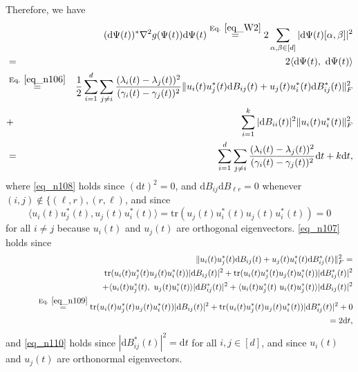 \documentclass[11pt,letterpaper]{article}
\begin{document}
\begin{enumerate}
\noindent  
  Therefore, we have
  \begin{eqnarray}
& & \!\!\!\!\!\!\!\!\!\!\!\!\!\!\!\!\!\!\!\!\!\!\!\!\!\!\!\!\!\!\!\!\!\!\!\!\!\!\!\!\!\! 
 (\mathrm{d}\Psi(t))^\ast  \nabla^2 g(\Psi(t)) \mathrm{d}\Psi(t)  \stackrel{\textrm{Eq. } \eqref{eq_W2}}{=} 2 \sum_{\alpha, \beta \in [d]}   |\mathrm{d}\Psi(t) [\alpha, \beta]|^2 \nonumber\\
  &=& 2 \langle \mathrm{d}\Psi(t), \,\, \mathrm{d}\Psi(t) \rangle \nonumber\\
  &\stackrel{\textrm{Eq. } \eqref{eq_n106}}{=}& \frac{1}{2} \sum_{i=1}^d     \sum_{j \neq i} \frac{(\lambda_i(t)- \lambda_j(t))^2}{(\gamma_i(t) - \gamma_j(t))^2} \|u_i(t) u_j^\ast(t)\mathrm{d}B_{ij}(t) + u_j(t) u_i^\ast(t)\mathrm{d}B_{ij}^\ast(t)\|_F^2 \nonumber\\
  &+&     \sum_{i=1}^k |\mathrm{d}B_{i i}(t)|^2  \|u_i(t) u_i^\ast(t)\|_F^2 \label{eq_n108}\\
%
  &=& \sum_{i=1}^d     \sum_{j \neq i} \frac{(\lambda_i(t)- \lambda_j(t))^2}{(\gamma_i(t) - \gamma_j(t))^2} \mathrm{d}t +   k \mathrm{d}t,  \label{eq_n107}
  \end{eqnarray}
  where \eqref{eq_n108} holds since $(\mathrm{d}t)^2 = 0$,  and $\mathrm{d}B_{ij} \mathrm{d}B_{\ell r} = 0$ whenever $(i,j) \notin\{(\ell, r), (r, \ell)$,  and since 
  \begin{equation}\label{eq_n109}
  \langle u_i(t) u_j^\ast(t), u_j(t) u_i^\ast(t) \rangle = \mathrm{tr}(u_j(t) u_i^\ast(t) u_j(t) u_i^\ast(t)) = 0
  \end{equation}
   for all $i \neq j$ because $u_i(t)$ and $u_j(t)$ are orthogonal eigenvectors.
  \eqref{eq_n107} holds since 
  \begin{eqnarray}
 & & \|u_i(t) u_j^\ast(t)\mathrm{d}B_{ij}(t) + u_j(t) u_i^\ast(t)\mathrm{d}B_{ij}^\ast(t)\|_F^2 = \nonumber\\
  & & \qquad \qquad  \mathrm{tr}(u_i(t) u_j^\ast(t) u_j(t) u_i^\ast(t))|\mathrm{d}B_{ij}(t)|^2 + 
   \mathrm{tr}(u_i(t) u_j^\ast(t) u_j(t) u_i^\ast(t))|\mathrm{d}B_{ij}^\ast(t)|^2 \nonumber\\
    & & \qquad \qquad \qquad \qquad+   \langle u_i(t) u_j^\ast(t), \, \, u_j(t) u_i^\ast(t) \rangle  | \mathrm{d}B_{ij}^\ast(t)|^2 +  \langle u_i(t) u_j^\ast(t) \, \, u_i(t) u_j^\ast(t) \rangle |\mathrm{d}B_{ij}(t)|^2 \nonumber\\
   &&  \qquad  \,\,\,\,\, \stackrel{\textrm{Eq. } \eqref{eq_n109}}{=} \mathrm{tr}(u_i(t) u_j^\ast(t) u_j(t) u_i^\ast(t))|\mathrm{d}B_{ij}(t)|^2 + 
   \mathrm{tr}(u_i(t) u_j^\ast(t) u_j(t) u_i^\ast(t))|\mathrm{d}B_{ij}^\ast(t)|^2 + 0 \nonumber\\
       & &  \qquad \qquad  = 2 \mathrm{d}t  \label{eq_n110},
\end{eqnarray}
%
and \eqref{eq_n110} holds since $|\mathrm{d}B_{ij}^\ast(t)|^2 = \mathrm{d}t$ for all $i,j \in [d]$, and since $u_i(t)$ and $u_j(t)$ are orthonormal eigenvectors.




\end{enumerate}
\end{document}
